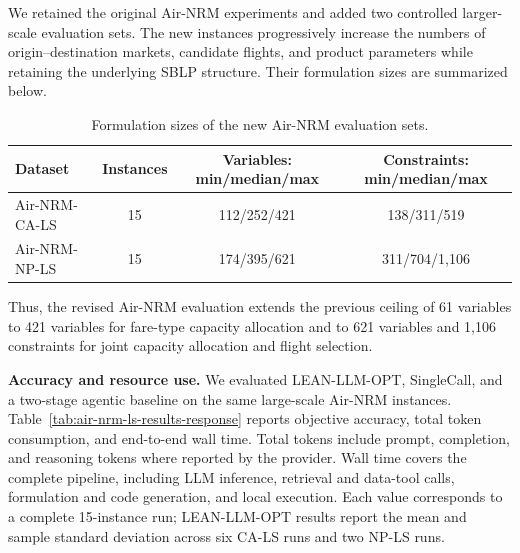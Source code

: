 \documentclass[11pt]{article}
\begin{document}
\begin{enumerate}[label=(R2.Major.\arabic*),leftmargin=*]
We retained the original Air-NRM experiments and added two controlled
larger-scale evaluation sets. The new instances progressively increase the
numbers of origin--destination markets, candidate flights, and product
parameters while retaining the underlying SBLP structure. Their formulation
sizes are summarized below.

\begin{table}[!htbp]
\centering
\caption{Formulation sizes of the new Air-NRM evaluation sets.}
\label{tab:air-nrm-scale-response}
\begin{tabular}{lccc}
\toprule
\textbf{Dataset} & \textbf{Instances}
& \textbf{Variables: min/median/max}
& \textbf{Constraints: min/median/max} \\
\midrule
Air-NRM-CA-LS & 15 & 112/252/421 & 138/311/519 \\
Air-NRM-NP-LS & 15 & 174/395/621 & 311/704/1,106 \\
\bottomrule
\end{tabular}
\end{table}

Thus, the revised Air-NRM evaluation extends the previous ceiling of 61
variables to 421 variables for fare-type capacity allocation and to 621
variables and 1,106 constraints for joint capacity allocation and flight
selection.

\medskip
\noindent\textbf{Accuracy and resource use.}
We evaluated LEAN-LLM-OPT, SingleCall, and a two-stage agentic baseline on
the same large-scale Air-NRM instances. Table~\ref{tab:air-nrm-ls-results-response}
reports objective accuracy, total token consumption, and end-to-end wall time.
Total tokens include prompt, completion, and reasoning tokens where reported
by the provider. Wall time covers the complete pipeline, including LLM
inference, retrieval and data-tool calls, formulation and code generation,
and local execution. Each value corresponds to a complete 15-instance run;
LEAN-LLM-OPT results report the mean and sample standard deviation across
six CA-LS runs and two NP-LS runs.

\begin{table}[!htbp]
\centering
\caption{Accuracy and resource use on the large-scale Air-NRM instances.}
\label{tab:air-nrm-ls-results-response}
\end{table}
\end{enumerate}
\end{document}
